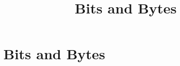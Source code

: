 \documentclass[../../OAE-SPEC-MAIN.tex]{subfiles}
\title{Bits and Bytes}\label{sec:bits-and-bytes}
\begin{document}

\chapter{Bits and Bytes}








\end{document}
